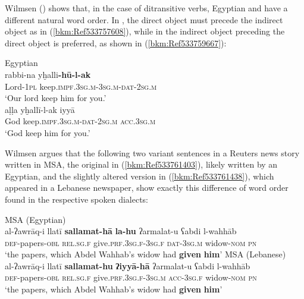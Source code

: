 \documentclass[output=paper]{langsci/langscibook}
\begin{document}
Wilmsen (\citeyear[104]{Wilmsen2010}) shows that, in the case of ditransitive verbs, Egyptian and  have a different natural {word order}. In , the direct object must precede the indirect object as in (\ref{bkm:Ref533757608}), while in   the indirect object preceding the direct object is preferred, as shown in (\ref{bkm:Ref533759667}):

\ea
\label{bkm:Ref533757608}Egyptian\\
\gll rabbi-na yḫalli\textbf{{}-hū-l-ak}\\
     Lord-\textsc{1pl} keep\textsc{.impf.3sg.m}{}-3\textsc{sg.m-dat-2sg.m}\\
\glt ‘Our lord keep him for you.’
\ex \label{bkm:Ref533759667}\\
\gll aḷḷa yḫallī-l-ak iyyā\\
     God keep\textsc{.impf.3sg.m-dat-2sg.m} \textsc{acc.}3\textsc{sg.m} \\
\glt ‘God keep him for you.’\z

Wilmsen argues that the following two variant sentences in a Reuters news story written in MSA, the original in (\ref{bkm:Ref533761403}), likely written by an Egyptian, and the slightly altered version in (\ref{bkm:Ref533761438}), which appeared in a Lebanese newspaper, show exactly this difference of {word order} found in the respective spoken dialects:

\ea
\label{bkm:Ref533761403}MSA (Egyptian)\\
\gll al-ʔawrāq-i llatī \textbf{sallamat-hā} \textbf{la-hu} ʔarmalat-u ʕabdi l-wahhāb\\
     \textsc{def}{}-papers-\textsc{obl} \textsc{rel.sg.f} give.\textsc{prf.3sg.f-3sg.f} \textsc{dat-3sg.m} widow-\textsc{nom} \textsc{pn}\\
     \glt ‘the papers, which Abdel Wahhab’s widow had \textbf{given} \textbf{him}’
\ex 
\label{bkm:Ref533761438}MSA (Lebanese)\\
\gll al-ʔawrāq-i llatī \textbf{sallamat-hu} \textbf{ʔiyyā-hā} ʔarmalat-u ʕabdi l-wahhāb\\
     \textsc{def}{}-papers-\textsc{obl} \textsc{rel.sg.f} give.\textsc{prf.3sg.f-3sg.m} \textsc{acc-3sg.f} widow-\textsc{nom} \textsc{pn}\\
\glt ‘the papers, which Abdel Wahhab’s widow had \textbf{given} \textbf{him}’\z
\end{document}
